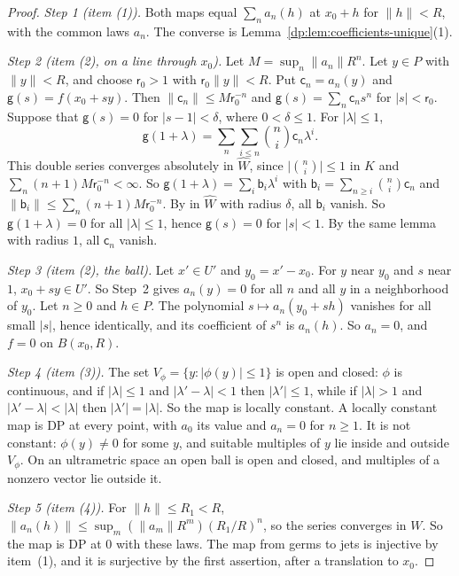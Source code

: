 \documentclass[11pt]{amsart}
\theoremstyle{definition}
\theoremstyle{remark}
\numberwithin{equation}{section}
\newcommand{\abs}[1]{\lvert #1\rvert}
\newcommand{\norm}[1]{\lVert #1\rVert}
\theoremstyle{plain}
\theoremstyle{definition}
\theoremstyle{plain}
\begin{document}
\begin{proof}
\emph{Step 1 (item (1)).} Both maps equal $\sum_na_n(h)$ at $x_0+h$ for $\norm h<R$, with the common laws $a_n$. The converse is Lemma~\ref{dp:lem:coefficients-unique}(1).

\emph{Step 2 (item (2), on a line through $x_0$).} Let $M=\sup_n\norm{a_n}R^n$. Let $y\in P$ with $\norm y<R$, and choose $\mathsf r_0>1$ with $\mathsf r_0\norm y<R$. Put $\mathsf c_n=a_n(y)$ and $\mathsf g(s)=f(x_0+sy)$. Then $\norm{\mathsf c_n}\le M\mathsf r_0^{-n}$ and $\mathsf g(s)=\sum_n\mathsf c_ns^n$ for $\abs s<\mathsf r_0$. Suppose that $\mathsf g(s)=0$ for $\abs{s-1}<\delta$, where $0<\delta\le1$. For $\abs\lambda\le1$,
\[
 \mathsf g(1+\lambda)=\sum_n\sum_{i\le n}\binom ni \mathsf c_n\lambda^i.
\]
This double series converges absolutely in $\widehat W$, since $\abs{\binom ni}\le1$ in $K$ and $\sum_n(n+1)M\mathsf r_0^{-n}<\infty$. So $\mathsf g(1+\lambda)=\sum_i\mathsf b_i\lambda^i$ with $\mathsf b_i=\sum_{n\ge i}\binom ni\mathsf c_n$ and $\norm{\mathsf b_i}\le\sum_n(n+1)M\mathsf r_0^{-n}$. By \cite[Lemma~A.1]{I} in $\widehat W$ with radius $\delta$, all $\mathsf b_i$ vanish. So $\mathsf g(1+\lambda)=0$ for all $\abs\lambda\le1$, hence $\mathsf g(s)=0$ for $\abs s<1$. By the same lemma with radius $1$, all $\mathsf c_n$ vanish.

\emph{Step 3 (item (2), the ball).} Let $x'\in U'$ and $y_0=x'-x_0$. For $y$ near $y_0$ and $s$ near $1$, $x_0+sy\in U'$. So Step~2 gives $a_n(y)=0$ for all $n$ and all $y$ in a neighborhood of $y_0$. Let $n\ge0$ and $h\in P$. The polynomial $s\mapsto a_n(y_0+sh)$ vanishes for all small $\abs s$, hence identically, and its coefficient of $s^n$ is $a_n(h)$. So $a_n=0$, and $f=0$ on $B(x_0,R)$.

\emph{Step 4 (item (3)).} The set $V_\phi=\{y:\abs{\phi(y)}\le1\}$ is open and closed: $\phi$ is continuous, and if $\abs\lambda\le1$ and $\abs{\lambda'-\lambda}<1$ then $\abs{\lambda'}\le1$, while if $\abs\lambda>1$ and $\abs{\lambda'-\lambda}<\abs\lambda$ then $\abs{\lambda'}=\abs\lambda$. So the map is locally constant. A locally constant map is DP at every point, with $a_0$ its value and $a_n=0$ for $n\ge1$. It is not constant: $\phi(y)\ne0$ for some $y$, and suitable multiples of $y$ lie inside and outside $V_\phi$. On an ultrametric space an open ball is open and closed, and multiples of a nonzero vector lie outside it.

\emph{Step 5 (item (4)).} For $\norm h\le R_1<R$, $\norm{a_n(h)}\le\sup_m(\norm{a_m}R^m)(R_1/R)^n$, so the series converges in $W$. So the map is DP at $0$ with these laws. The map from germs to jets is injective by item~(1), and it is surjective by the first assertion, after a translation to $x_0$.
\end{proof}
\end{document}
